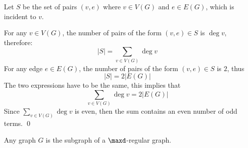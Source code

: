 \begin{prf}
    Let $S$ be the set of pairs $(v, e)$ where $v \in V(G)$ and $e \in E(G)$, which is incident to $v$.

    For any $v \in V(G)$, the number of pairs of the form $(v, e) \in S$ is $\deg{v}$, therefore:
    \begin{equation*}
        |S| = \sum_{v \in V(G)}\deg{v}
    \end{equation*}
    For any edge $e \in E(G)$, the number of pairs of the form $(v, e) \in S$ is $2$, thus
    \begin{equation*}
        |S| = 2|E(G)|
    \end{equation*}
    The two expressions have to be the same, this implies that
    \begin{equation*}
        \sum_{v \in V(G)}\deg{v} = 2|E(G)|
    \end{equation*}
    Since $\sum_{v \in V(G)}\deg{v}$ is even, then the sum contains an even number of odd terms. \qed
\end{prf}
\begin{proposition}
    Any graph $G$ is the subgraph of a $\maxd$-regular graph.
\end{proposition}
